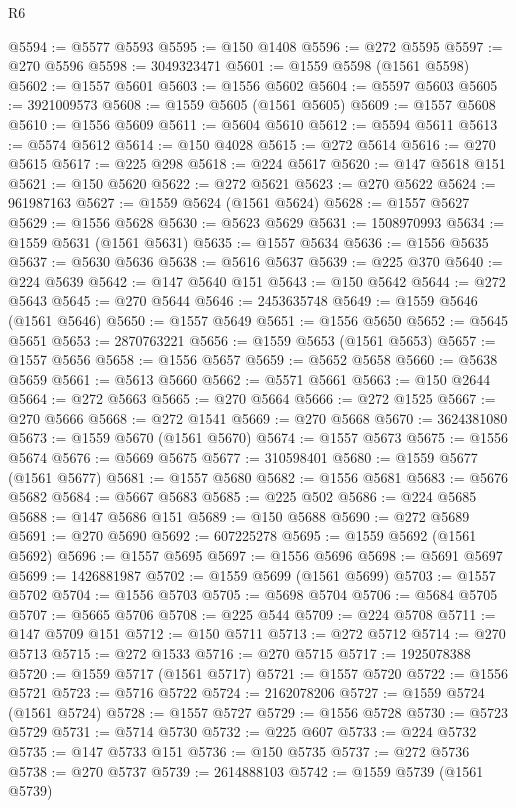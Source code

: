 \begin{lexlean}{R6}
\begin{coremodule}
@5594 := @5577 @5593
@5595 := @150 @1408
@5596 := @272 @5595
@5597 := @270 @5596
@5598 := 3049323471
@5601 := @1559 @5598 (@1561 @5598)
@5602 := @1557 @5601
@5603 := @1556 @5602
@5604 := @5597 @5603
@5605 := 3921009573
@5608 := @1559 @5605 (@1561 @5605)
@5609 := @1557 @5608
@5610 := @1556 @5609
@5611 := @5604 @5610
@5612 := @5594 @5611
@5613 := @5574 @5612
@5614 := @150 @4028
@5615 := @272 @5614
@5616 := @270 @5615
@5617 := @225 @298
@5618 := @224 @5617
@5620 := @147 @5618 @151
@5621 := @150 @5620
@5622 := @272 @5621
@5623 := @270 @5622
@5624 := 961987163
@5627 := @1559 @5624 (@1561 @5624)
@5628 := @1557 @5627
@5629 := @1556 @5628
@5630 := @5623 @5629
@5631 := 1508970993
@5634 := @1559 @5631 (@1561 @5631)
@5635 := @1557 @5634
@5636 := @1556 @5635
@5637 := @5630 @5636
@5638 := @5616 @5637
@5639 := @225 @370
@5640 := @224 @5639
@5642 := @147 @5640 @151
@5643 := @150 @5642
@5644 := @272 @5643
@5645 := @270 @5644
@5646 := 2453635748
@5649 := @1559 @5646 (@1561 @5646)
@5650 := @1557 @5649
@5651 := @1556 @5650
@5652 := @5645 @5651
@5653 := 2870763221
@5656 := @1559 @5653 (@1561 @5653)
@5657 := @1557 @5656
@5658 := @1556 @5657
@5659 := @5652 @5658
@5660 := @5638 @5659
@5661 := @5613 @5660
@5662 := @5571 @5661
@5663 := @150 @2644
@5664 := @272 @5663
@5665 := @270 @5664
@5666 := @272 @1525
@5667 := @270 @5666
@5668 := @272 @1541
@5669 := @270 @5668
@5670 := 3624381080
@5673 := @1559 @5670 (@1561 @5670)
@5674 := @1557 @5673
@5675 := @1556 @5674
@5676 := @5669 @5675
@5677 := 310598401
@5680 := @1559 @5677 (@1561 @5677)
@5681 := @1557 @5680
@5682 := @1556 @5681
@5683 := @5676 @5682
@5684 := @5667 @5683
@5685 := @225 @502
@5686 := @224 @5685
@5688 := @147 @5686 @151
@5689 := @150 @5688
@5690 := @272 @5689
@5691 := @270 @5690
@5692 := 607225278
@5695 := @1559 @5692 (@1561 @5692)
@5696 := @1557 @5695
@5697 := @1556 @5696
@5698 := @5691 @5697
@5699 := 1426881987
@5702 := @1559 @5699 (@1561 @5699)
@5703 := @1557 @5702
@5704 := @1556 @5703
@5705 := @5698 @5704
@5706 := @5684 @5705
@5707 := @5665 @5706
@5708 := @225 @544
@5709 := @224 @5708
@5711 := @147 @5709 @151
@5712 := @150 @5711
@5713 := @272 @5712
@5714 := @270 @5713
@5715 := @272 @1533
@5716 := @270 @5715
@5717 := 1925078388
@5720 := @1559 @5717 (@1561 @5717)
@5721 := @1557 @5720
@5722 := @1556 @5721
@5723 := @5716 @5722
@5724 := 2162078206
@5727 := @1559 @5724 (@1561 @5724)
@5728 := @1557 @5727
@5729 := @1556 @5728
@5730 := @5723 @5729
@5731 := @5714 @5730
@5732 := @225 @607
@5733 := @224 @5732
@5735 := @147 @5733 @151
@5736 := @150 @5735
@5737 := @272 @5736
@5738 := @270 @5737
@5739 := 2614888103
@5742 := @1559 @5739 (@1561 @5739)

\end{coremodule}
\end{lexlean}
